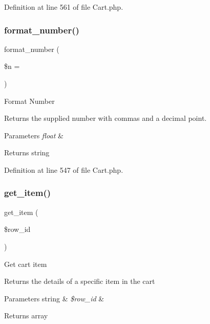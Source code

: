 Definition at line 561 of file Cart.\+php.

\mbox{\label{class_c_i___cart_aea64eda9cf978b1e25c24458ca7e69df}} 
\subsubsection{\texorpdfstring{format\_number()}{format\_number()}}
{\footnotesize\ttfamily format\+\_\+number (\begin{DoxyParamCaption}\item[{}]{\$n = {\ttfamily \textquotesingle{}\textquotesingle{}} }\end{DoxyParamCaption})}

Format Number

Returns the supplied number with commas and a decimal point.


\begin{DoxyParams}{Parameters}
{\em float} & \\
\hline
\end{DoxyParams}
\begin{DoxyReturn}{Returns}
string 
\end{DoxyReturn}


Definition at line 547 of file Cart.\+php.

\mbox{\label{class_c_i___cart_a73841dfae18a2719c7eb6d31978067a9}} 
\subsubsection{\texorpdfstring{get\_item()}{get\_item()}}
{\footnotesize\ttfamily get\+\_\+item (\begin{DoxyParamCaption}\item[{}]{\$row\+\_\+id }\end{DoxyParamCaption})}

Get cart item

Returns the details of a specific item in the cart


\begin{DoxyParams}[1]{Parameters}
string & {\em \$row\+\_\+id} & \\
\hline
\end{DoxyParams}
\begin{DoxyReturn}{Returns}
array 
\end{DoxyReturn}


